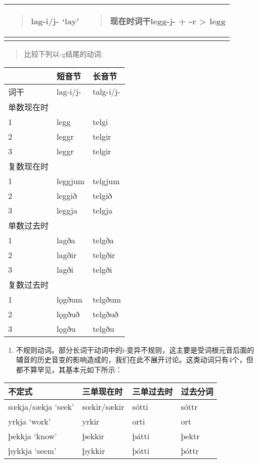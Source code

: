 \begin{longtable}{ll}
\toprule
\begin{quote}lag-i/j- `lay‌'\end{quote} & \begin{quote}现在时词干legg-j- + -r \textgreater{} legg\end{quote} \\
\midrule
\endhead
\bottomrule
\endfoot
\end{longtable}

\begin{quote}
比较下列以-g结尾的动词:
\end{quote}

\begin{longtable}{lll}
\toprule
 & 短音节 & 长音节 \\
\midrule
\endhead
\bottomrule
\endfoot
词干 & lag-i/j- & talg-i/j- \\
单数现在时 & & \\
1 & legg & telgi \\
2 & leggr & telgir \\
3 & leggr & telgir \\
复数现在时 & & \\
1 & leggjum & telgjum \\
2 & leggið & telgið \\
3 & leggja & telgja \\
单数过去时 & & \\
1 & lagða & telgða \\
2 & lagðir & telgðir \\
3 & lagði & telgði \\
复数过去时 & & \\
1 & lǫgðum & telgðum \\
2 & lǫgðuð & telgðuð \\
3 & lǫgðu & telgðu \\
\end{longtable}

\begin{enumerate}
\def\labelenumi{\arabic{enumi})}
\setcounter{enumi}{2}
\item
  不规则动词。部分长词干动词中的i-变异不规则，这主要是受词根元音后面的辅音的历史音变的影响造成的，我们在此不展开讨论。这类动词只有4个，但都不算罕见，其基本元如下所示：
\end{enumerate}

\begin{longtable}{llll}
\toprule
不定式 & 三单现在时 & 三单过去时 & 过去分词 \\
\midrule
\endhead
\bottomrule
\endfoot
sœkja/sækja `seek' & sœkir/sækir & sótti & sóttr \\
yrkja `work' & yrkir & orti & ort \\
þekkja `know' & þekkir & þátti & þektr \\
þykkja `seem' & þykkir & þótti & þóttr \\
\end{longtable}

